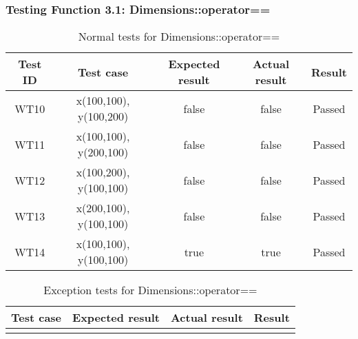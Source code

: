 \documentclass{article}
\begin{document}
\subsubsection{Testing Function 3.1: Dimensions::operator==}
\begin{table}[H]
    \caption{Normal tests for Dimensions::operator==}
    \label{tab:wb}
    \centering
    \begin{tabular}{|c|c|c|c||c|}
        \hline
        \textbf{Test ID} & \textbf{Test case} & \textbf{Expected result} & \textbf{Actual result} & \textbf{Result}\\
        \hline
        WT10 & x(100,100), y(100,200) & false & false & Passed \\
        \hline
        WT11 & x(100,100), y(200,100) & false & false & Passed \\
        \hline
        WT12 & x(100,200), y(100,100) & false & false & Passed \\
        \hline
        WT13 & x(200,100), y(100,100) & false & false & Passed \\
        \hline
        WT14 & x(100,100), y(100,100) & true & true & Passed \\
        \hline
    \end{tabular}
\end{table}
\begin{table}[H]
    \caption{Exception tests for Dimensions::operator==}
    \label{tab:wb}
    \centering
    \begin{tabular}{|c|c|c||c|}
        \hline
        \textbf{Test case} & \textbf{Expected result} & \textbf{Actual result} & \textbf{Result}\\
        \hline
         &  &  &  \\
        \hline
    \end{tabular}
\end{table}
\end{document}
